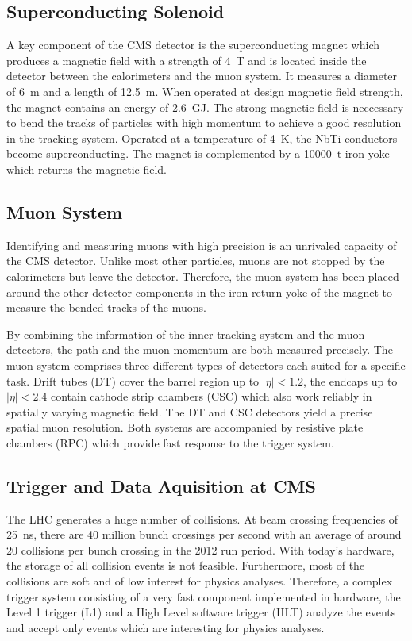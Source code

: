 \subsection{Superconducting Solenoid}

A key component of the CMS detector is the superconducting magnet which
produces a magnetic field with a strength of \SI{4}{\tesla} and is located
inside the detector between the calorimeters and the muon system. It measures a
diameter of \SI{6}{\meter} and a length of \SI{12.5}{\meter}. When operated at
design magnetic field strength, the magnet contains an energy of
\SI{2.6}{\giga\joule}. The strong magnetic field is neccessary to bend the
tracks of particles with high momentum to achieve a good resolution in the
tracking system. Operated at a temperature of \SI{4}{\kelvin}, the NbTi conductors become
superconducting. The magnet is complemented by a \SI{10000}{\tonne} iron yoke
which returns the magnetic field.

\subsection{Muon System}

Identifying and measuring muons with high precision is an unrivaled capacity of
the CMS detector. Unlike most other particles, muons are not stopped by the
calorimeters but leave the detector. Therefore, the muon system has been placed
around the other detector components in the iron return yoke of the magnet to
measure the bended tracks of the muons.

By combining the information of the inner tracking system and the muon
detectors, the path and the muon momentum are both measured precisely. The muon
system comprises three different types of detectors each suited for a specific
task. Drift tubes (DT) cover the barrel region up to $|\eta| < 1.2$, the endcaps
up to $|\eta| < 2.4$ contain cathode strip chambers (CSC) which also
work reliably in spatially varying magnetic field. The DT and CSC detectors
yield a precise spatial muon resolution. Both systems are accompanied by
resistive plate chambers (RPC) which provide fast response to the trigger
system.

\subsection{Trigger and Data Aquisition at CMS}

The LHC generates a huge number of collisions. At beam crossing frequencies of
\SI{25}{\nano \second}, there are 40 million bunch crossings per second with an
average of around 20 collisions per bunch crossing in the 2012 run period. With
today's hardware, the storage of all collision events is not feasible.
Furthermore, most of the collisions are soft and of low interest for physics
analyses. Therefore, a complex trigger system consisting of a very fast
component implemented in hardware, the Level 1 trigger (L1) and a High Level
software trigger (HLT) analyze the events and accept only events which are
interesting for physics analyses.

